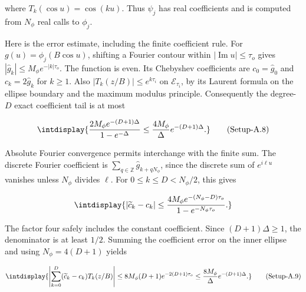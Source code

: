 
where \(T_k(\cos u)=\cos(ku)\). Thus \(\psi_j\) has real coefficients and is computed from \(N_\phi\) real calls to \(\phi_j\).



Here is the error estimate, including the finite coefficient rule. For \(g(u)=\phi_j(B\cos u)\), shifting a Fourier contour within \(|\operatorname{Im}u|\le\tau_o\) gives \(|\widehat g_k|\le M_\phi e^{-|k|\tau_o}\). The function is even. Its Chebyshev coefficients are \(c_0=\widehat g_0\) and \(c_k=2\widehat g_k\) for \(k\ge1\). Also \(|T_k(z/B)|\le e^{k\tau_i}\) on \(\mathcal E_{\tau_i}\), by its Laurent formula on the ellipse boundary and the maximum modulus principle. Consequently the degree-\(D\) exact coefficient tail is at most


\label{int:eq-setup-a-8}
\begingroup\renewcommand{\theHequation}{intdisplay.970}
\begin{equation}
\intdisplay{
\frac{2M_\phi e^{-(D+1)\Delta}}{1-e^{-\Delta}}
\le \frac{4M_\phi}{\Delta}e^{-(D+1)\Delta}.
}
\tag{Setup-A.8}
\label{int:eq-0495-setup-a-8}
\end{equation}
\endgroup


Absolute Fourier convergence permits interchange with the finite sum. The discrete Fourier coefficient is \(\sum_{q\in\mathbb Z}\widehat g_{k+qN_\phi}\), since the discrete sum of \(e^{i\ell u}\) vanishes unless \(N_\phi\) divides \(\ell\). For \(0\le k\le D<N_\phi/2\), this gives


\begingroup\renewcommand{\theHequation}{intdisplay.971}
\begin{equation*}
\intdisplay{
|\widetilde c_k-c_k|
\le\frac{4M_\phi e^{-(N_\phi-D)\tau_o}}
           {1-e^{-N_\phi\tau_o}}.
}
\end{equation*}
\endgroup


The factor four safely includes the constant coefficient. Since \((D+1)\Delta\ge1\), the denominator is at least \(1/2\). Summing the coefficient error on the inner ellipse and using \(N_\phi=4(D+1)\) yields


\label{int:eq-setup-a-9}
\begingroup\renewcommand{\theHequation}{intdisplay.972}
\begin{equation}
\intdisplay{
\left|\sum_{k=0}^D(\widetilde c_k-c_k)T_k(z/B)\right|
\le8M_\phi(D+1)e^{-2(D+1)\tau_o}
\le\frac{8M_\phi}{\Delta}e^{-(D+1)\Delta}.
}
\tag{Setup-A.9}
\label{int:eq-0496-setup-a-9}
\end{equation}
\endgroup

